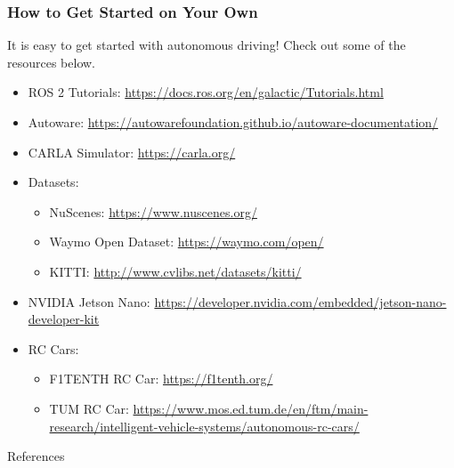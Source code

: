 \documentclass[aspectratio=169]{beamer}
\begin{document}
\begin{frame}
\frametitle{How to Get Started on Your Own}
It is easy to get started with autonomous driving! Check out some of the
resources below.
\footnotesize
\begin{itemize}
    \item ROS 2 Tutorials: \url{https://docs.ros.org/en/galactic/Tutorials.html}
    \item Autoware: \url{https://autowarefoundation.github.io/autoware-documentation/}
    \item CARLA Simulator: \url{https://carla.org/}
    \item Datasets:
    \begin{itemize}
        \footnotesize
        \item NuScenes: \url{https://www.nuscenes.org/}
        \item Waymo Open Dataset: \url{https://waymo.com/open/}
        \item KITTI: \url{http://www.cvlibs.net/datasets/kitti/}
    \end{itemize}
    \item NVIDIA Jetson Nano: \url{https://developer.nvidia.com/embedded/jetson-nano-developer-kit}
    \item RC Cars:
    \begin{itemize}
        \footnotesize
        \item F1TENTH RC Car: \url{https://f1tenth.org/}
        \item TUM RC Car: \url{https://www.mos.ed.tum.de/en/ftm/main-research/intelligent-vehicle-systems/autonomous-rc-cars/}
    \end{itemize}
\end{itemize}
\end{frame}

\begin{frame}[allowframebreaks]{References}
\renewcommand*{\bibfont}{\normalfont\scriptsize}
\printbibliography
\end{frame}
\end{document}
